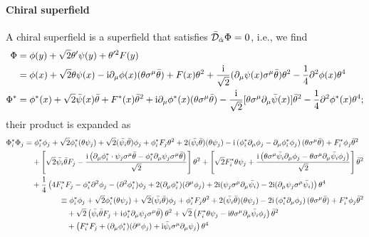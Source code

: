 \documentclass[CheatSheet]{subfiles}
\newcommand{\OD}{{\mathcal D}}
\begin{document}
\paragraph{Chiral superfield} A chiral superfield is a superfield that satisfies $\bar \OD_\dalpha \Phi = 0$, i.e.,
we find
\begin{align}
 \Phi
 &= \phi(y) + \sqrt{2} \theta' \psi(y) + \theta'^2 F(y)\\
 &= \phi(x)+\sqrt{2} \theta \psi(x)-\mathrm{i} \partial_{\mu}\phi(x) (\theta \sigma^{\mu}\bar\theta)+F(x) \theta^2+\frac{\mathrm{i}}{\sqrt{2}} (\partial_{\mu}\psi(x)\sigma^{\mu}\bar\theta) \theta^2-\frac{1}{4} \partial^2\phi(x) \theta^4
\\
 \Phi^*
 &= \phi^*(x)+\sqrt{2} \bar{\psi}(x)\bar\theta+F^*(x) \bar\theta^2+\mathrm{i} \partial_{\mu}\phi^*(x) (\theta \sigma^{\mu}\bar\theta)-\frac{\mathrm{i}}{\sqrt{2}}[\theta \sigma^{\mu}\partial_{\mu}\bar{\psi}(x)] \bar\theta^2-\frac{1}{4} \partial^2\phi^*(x) \theta^4;
\end{align}
their product is expanded as
\begin{align}
\begin{split}
 \Phi_i^* \Phi_j
 &=
 \phi_i^*\phi_j + \sqrt{2} \phi_i^*(\theta \psi_j)+\sqrt{2} (\bar{\psi_i}\bar\theta)\phi_j
 + \phi_i^* F_j \theta^2+2 (\bar{\psi_i}\bar\theta)(\theta \psi_j)
 -\mathrm{i} \left(\phi_i^*\partial_{\mu}\phi_j-\partial_{\mu}\phi_i^*\phi_j\right) (\theta \sigma^{\mu}\bar\theta)
 +F_i^*\phi_j \bar\theta^2
 \\&\quad
+\left[
\sqrt{2} \bar{\psi_i}\bar\theta F_j-\frac{\mathrm{i}\left( \partial_{\mu}\phi_i^*\cdot\psi_j\sigma^{\mu}\bar\theta-\phi_i^*\partial_{\mu}\psi_j\sigma^{\mu}\bar\theta\right)}{\sqrt2}\right]\theta^2
+\left[\sqrt2 F_i^*\theta \psi_j+\frac{\mathrm{i}\left(\theta \sigma^{\mu}\bar{\psi_i}\partial_{\mu}\phi_j-\theta \sigma^{\mu}\partial_{\mu}\bar{\psi_i}\phi_j\right)}{\sqrt2}\right] \bar\theta^2
\\&\quad
+\frac{1}{4} \left(4 F_i^*F_j-\phi_i^*\partial^2\phi_j-(\partial^2\phi_i^*)\phi_j+2 (\partial_{\mu}\phi_i^*)(\partial^{\mu}\phi_j)+2 \mathrm{i} (\psi_j\sigma^{\mu}\partial_{\mu}\bar{\psi_i})-2 \mathrm{i} (\partial_{\mu}\psi_j\sigma^{\mu}\bar{\psi_i})\right) \theta^4
\end{split}
\\
\begin{split}
 &\equiv
 \phi_i^*\phi_j + \sqrt{2} \phi_i^*(\theta \psi_j)+\sqrt{2} (\bar{\psi_i}\bar\theta)\phi_j
 + \phi_i^* F_j \theta^2+2 (\bar{\psi_i}\bar\theta)(\theta \psi_j)
 -2\mathrm{i} \left(\phi_i^*\partial_{\mu}\phi_j\right) (\theta \sigma^{\mu}\bar\theta)
 +F_i^*\phi_j \bar\theta^2
 \\&\quad
+\sqrt2\left(
\bar{\psi_i}\bar\theta F_j+\mathrm{i}\phi_i^*\partial_{\mu}\psi_j\sigma^{\mu}\bar\theta\right)\theta^2
+\sqrt2\left(F_i^*\theta \psi_j-\mathrm{i}\theta \sigma^{\mu}\partial_{\mu}\bar{\psi_i}\phi_j\right) \bar\theta^2
\\&\quad
+\left(F_i^*F_j+(\partial_{\mu}\phi_i^*)(\partial^{\mu}\phi_j)+\mathrm{i}\bar{\psi_i}\sigma^\mu\partial_{\mu}\psi_j\right) \theta^4
\end{split}
\end{align}
\end{document}
